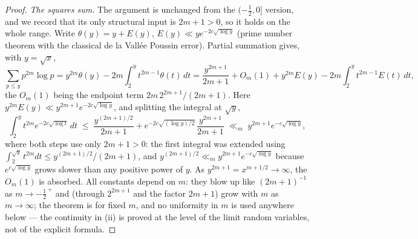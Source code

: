 \documentclass[11pt]{article}
\begin{document}
\begin{proof}
\emph{The squares sum.} The argument is unchanged from the
$(-\tfrac12,0]$ version, and we record that its only structural input
is $2m+1>0$, so it holds on the whole range. Write
$\theta(y)=y+E(y)$, $E(y)\ll ye^{-2c\sqrt{\log y}}$ (prime number
theorem with the classical de la Vall\'ee Poussin error). Partial
summation gives, with $y=\sqrt x$,
\[
\sum_{p\le y}p^{2m}\log p
=y^{2m}\theta(y)-2m\int_2^y t^{2m-1}\theta(t)\,dt
=\frac{y^{2m+1}}{2m+1}+O_m(1)
+y^{2m}E(y)-2m\int_2^y t^{2m-1}E(t)\,dt ,
\]
the $O_m(1)$ being the endpoint term
$2m\,2^{2m+1}/(2m+1)$. Here $y^{2m}E(y)\ll y^{2m+1}e^{-2c\sqrt{\log y}}$,
and splitting the integral at $\sqrt y$,
\[
\int_2^y t^{2m}e^{-2c\sqrt{\log t}}\,dt
\;\le\;\frac{y^{(2m+1)/2}}{2m+1}
+e^{-2c\sqrt{(\log y)/2}}\,\frac{y^{2m+1}}{2m+1}
\;\ll_m\; y^{2m+1}e^{-c\sqrt{\log y}} ,
\]
where both steps use only $2m+1>0$: the first integral was extended
using $\int_2^{\sqrt y}t^{2m}dt\le y^{(2m+1)/2}/(2m+1)$, and
$y^{(2m+1)/2}\ll_m y^{2m+1}e^{-c\sqrt{\log y}}$ because
$e^{c\sqrt{\log y}}$ grows slower than any positive power of $y$. As
$y^{2m+1}=x^{m+1/2}\to\infty$, the $O_m(1)$ is absorbed. All constants
depend on $m$: they blow up like $(2m+1)^{-1}$ as $m\to-\tfrac12^{\,+}$
and (through $2^{2m+1}$ and the factor $2m+1$) grow with $m$ as
$m\to\infty$; the theorem is for fixed $m$, and no uniformity in $m$ is
used anywhere below --- the continuity in (ii) is proved at the level
of the limit random variables, not of the explicit formula.
\end{proof}
\end{document}
